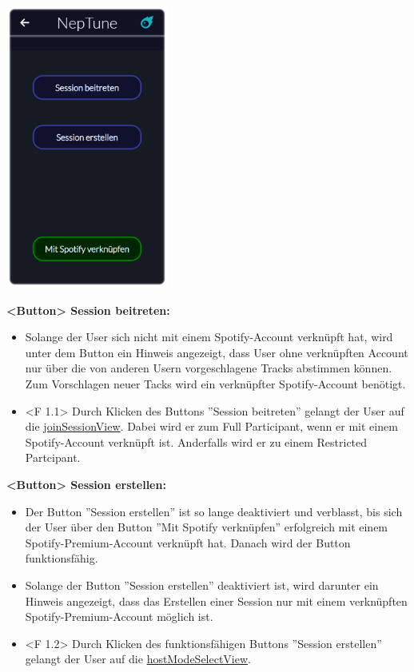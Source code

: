 \documentclass[oneside, ngerman]{sdqtechreport}
\begin{document}
\begin{center}
    \hypertarget{startView}{}
    \includegraphics[width=0.4\textwidth]{LATEX/Pflichtenheft/GraphicDesigns/startPage.png}
\end{center}

\textbf{<Button> Session beitreten:}
\begin{itemize}
    \item Solange der User sich nicht mit einem Spotify-Account verknüpft hat, wird unter dem Button ein Hinweis angezeigt, dass User ohne verknüpften Account nur über die von anderen Usern vorgeschlagene Tracks abstimmen können. Zum Vorschlagen neuer Tacks wird ein verknüpfter Spotify-Account benötigt.
    \hypertarget{<F 1.1>}{}
    \item <F 1.1> Durch Klicken des Buttons ''Session beitreten'' gelangt der User auf die \hyperlink{joinSessionView}{joinSessionView}. Dabei wird er zum Full Participant, wenn er mit einem Spotify-Account verknüpft ist. Anderfalls wird er zu einem Restricted Partcipant.
\end{itemize}

\textbf{<Button> Session erstellen:}
\begin{itemize}
    \item Der Button ''Session erstellen'' ist so lange deaktiviert und verblasst, bis sich der User über den Button ''Mit Spotify verknüpfen'' erfolgreich mit einem Spotify-Premium-Account verknüpft hat. Danach wird der Button funktionsfähig.
    \item Solange der Button ''Session erstellen'' deaktiviert ist, wird darunter ein Hinweis angezeigt, dass das Erstellen einer Session nur mit einem verknüpften Spotify-Premium-Account möglich ist.
    \hypertarget{<F 1.2>}{}
    \item <F 1.2> Durch Klicken des funktionsfähigen Buttons ''Session erstellen'' gelangt der User auf die \hyperlink{hostModeSelectView}{hostModeSelectView}.
\end{itemize}
\end{document}
